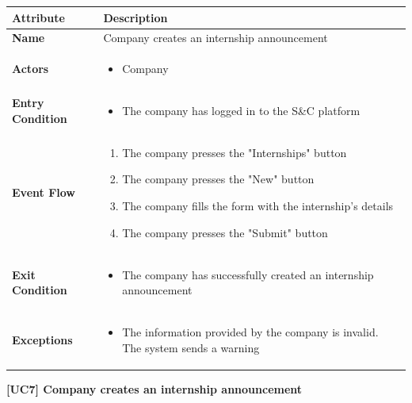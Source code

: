 \begin{center}
    
    \begin{tabular}{|p{3cm}|p{9cm}|}
    \hline
    \textbf{Attribute} & \textbf{Description} \\ \hline
    \textbf{Name} & Company creates an internship announcement \\ \hline
    \textbf{Actors} & 
    \begin{itemize}
        \item Company
    \end{itemize} \\ \hline
    \textbf{Entry Condition} & 
    \begin{itemize}
        \item The company has logged in to the S\&C platform
    \end{itemize}\\ \hline
    \textbf{Event Flow} & 
    \begin{enumerate}
        \item The company presses the "Internships" button 
        \item The company presses the "New" button
        \item The company fills the form with the internship's details
        \item The company presses the "Submit" button
    \end{enumerate} \\ \hline
    \textbf{Exit Condition} &
    \begin{itemize}
        \item The company has successfully created an internship announcement
    \end{itemize} \\ \hline
    \textbf{Exceptions} & 
    \begin{itemize}
        \item [5.a] The information provided by the company is invalid. The system sends a warning
    \end{itemize} \\ \hline
    \end{tabular}
    \newline
    \newline
    \textbf{[UC7] Company creates an internship announcement}
    \newline
    \newline



\end{center}
